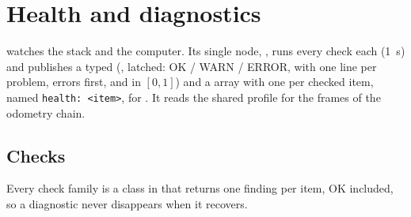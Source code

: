 \chapter{Health and diagnostics}
\label{ch:health}

 watches the stack and the computer. Its single node,
, runs every check each  (1~s) and publishes a typed
 (, latched:  OK / WARN / ERROR, 
with one line per problem, errors first, and  in $[0, 1]$) and a
 array with one  per checked item, named
\texttt{health: <item>}, for . It reads the shared  profile
for the frames of the odometry chain.

\section{Checks}

Every check family is a  class in  that returns one finding per
item, OK included, so a diagnostic never disappears when it recovers.

